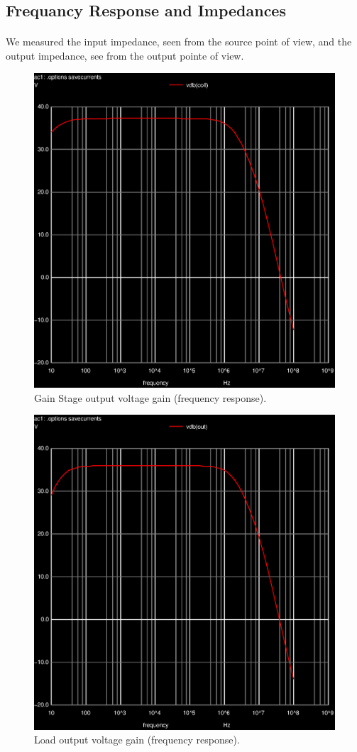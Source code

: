 \subsection{Frequancy Response and Impedances}

\paragraph{} We measured the input impedance, seen from the source point of view, and the output impedance, see from the output pointe of view.

\begin{figure}[!h] \centering
\includegraphics[width=0.6\linewidth]{stage.eps}
\caption{Gain Stage output voltage gain (frequency response).}
\label{fig:gainstage}
\end{figure}

\begin{figure}[!h] \centering
\includegraphics[width=0.6\linewidth]{output.eps}
\caption{Load output voltage gain (frequency response).}
\label{fig:outputstage}
\end{figure}

